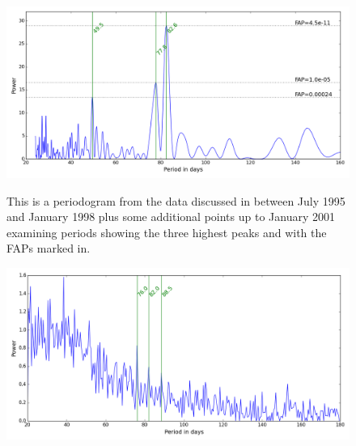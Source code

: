 \begin{figure}[!htbp]
\begin{center}
\includegraphics[scale=0.50]{Figures/hstb4min.png} \\
\end{center}
\caption{This is a periodogram  from the {\hst} data discussed in \citet{benedict98} between July 1995 and
  January 1998 plus some additional points up to January 2001 examining periods showing the three highest peaks and with
  the FAPs marked in. }
\protect\label{fig:hstb4min}
\end{figure}

\begin{figure}[!htbp]
\begin{center}
\includegraphics[scale=0.50]{Figures/hstwinfunc-orig.png} \\
\end{center}
\caption{}
\protect\label{fig:hstwf}
\end{figure}

